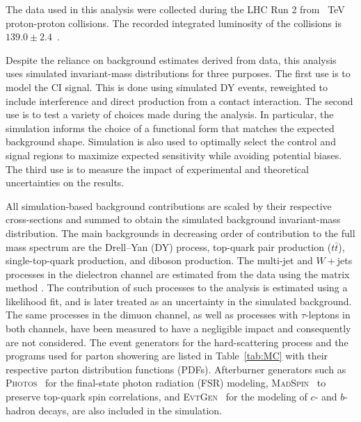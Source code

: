 
The data used in this analysis were collected during the LHC Run 2 from ~TeV proton-proton collisions.
The recorded integrated luminosity of the collisions is $139.0\pm2.4$~\fb \cite{ATLAS-CONF-2019-021}.

Despite the reliance on background estimates derived from data, this analysis uses simulated invariant-mass distributions for three purposes.
The first use is to model the CI signal. This is done using simulated DY events, reweighted to include interference and direct production from a contact interaction.
The second use is to test a variety of choices made during the analysis. In particular, the simulation informs the choice of a functional form that matches the expected background shape. Simulation is also used to optimally select the control and signal regions to maximize expected sensitivity while avoiding potential biases.
The third use is to measure the impact of experimental and theoretical uncertainties on the results.

All simulation-based background contributions are scaled by their respective cross-sections and summed to obtain the simulated background invariant-mass distribution.
The main backgrounds in decreasing order of contribution to the full mass spectrum are the Drell--Yan (DY) process, top-quark pair production ($t\bar{t}$), single-top-quark production, and diboson production.
The multi-jet and $W+$jets processes in the dielectron channel are estimated from the data using the matrix method \cite{EXOT-2016-05}. The contribution of such processes to the analysis is estimated using a likelihood fit, and is later treated as an uncertainty in the simulated background.
The same processes in the dimuon channel, as well as processes with $\tau$-leptons in both channels, have been measured to have a negligible impact and consequently are not considered.
The event generators for the hard-scattering process and the programs used for parton showering are listed in Table~\ref{tab:MC} with their respective parton distribution functions (PDFs).
Afterburner generators such as \textsc{Photos}~\cite{Golonka:2005pn} for the final-state photon radiation (FSR) modeling, \textsc{MadSpin}~\cite{Artoisenet:2012st} to preserve top-quark spin correlations, and \textsc{EvtGen}~\cite{Lange:2001uf} for the modeling of $c$- and $b$-hadron decays, are also included in the simulation.

